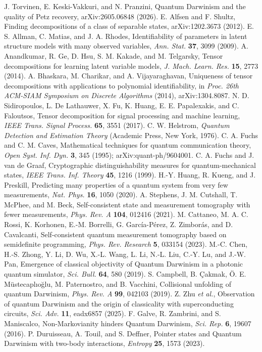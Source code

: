  J. Torvinen, E. Keski-Vakkuri, and N. Pranzini, Quantum Darwinism and the quality of Petz recovery, arXiv:2605.06848 (2026).
 E. Alfsen and F. Shultz, Finding decompositions of a class of separable states, arXiv:1202.3673 (2012).
 E. S. Allman, C. Matias, and J. A. Rhodes, Identifiability of parameters in latent structure models with many observed variables, \emph{Ann. Stat.} \textbf{37}, 3099 (2009).
 A. Anandkumar, R. Ge, D. Hsu, S. M. Kakade, and M. Telgarsky, Tensor decompositions for learning latent variable models, \emph{J. Mach. Learn. Res.} \textbf{15}, 2773 (2014).
 A. Bhaskara, M. Charikar, and A. Vijayaraghavan, Uniqueness of tensor decompositions with applications to polynomial identifiability, in \emph{Proc. 26th ACM-SIAM Symposium on Discrete Algorithms} (2014), arXiv:1304.8087.
 N. D. Sidiropoulos, L. De Lathauwer, X. Fu, K. Huang, E. E. Papalexakis, and C. Faloutsos, Tensor decomposition for signal processing and machine learning, \emph{IEEE Trans. Signal Process.} \textbf{65}, 3551 (2017).
 C. W. Helstrom, \emph{Quantum Detection and Estimation Theory} (Academic Press, New York, 1976).
 C. A. Fuchs and C. M. Caves, Mathematical techniques for quantum communication theory, \emph{Open Syst. Inf. Dyn.} \textbf{3}, 345 (1995); arXiv:quant-ph/9604001.
 C. A. Fuchs and J. van de Graaf, Cryptographic distinguishability measures for quantum-mechanical states, \emph{IEEE Trans. Inf. Theory} \textbf{45}, 1216 (1999).
 H.-Y. Huang, R. Kueng, and J. Preskill, Predicting many properties of a quantum system from very few measurements, \emph{Nat. Phys.} \textbf{16}, 1050 (2020).
 A. Stephens, J. M. Cutshall, T. McPhee, and M. Beck, Self-consistent state and measurement tomography with fewer measurements, \emph{Phys. Rev. A} \textbf{104}, 012416 (2021).
 M. Cattaneo, M. A. C. Rossi, K. Korhonen, E.-M. Borrelli, G. Garc\'ia-P\'erez, Z. Zimbor\'as, and D. Cavalcanti, Self-consistent quantum measurement tomography based on semidefinite programming, \emph{Phys. Rev. Research} \textbf{5}, 033154 (2023).
 M.-C. Chen, H.-S. Zhong, Y. Li, D. Wu, X.-L. Wang, L. Li, N.-L. Liu, C.-Y. Lu, and J.-W. Pan, Emergence of classical objectivity of Quantum Darwinism in a photonic quantum simulator, \emph{Sci. Bull.} \textbf{64}, 580 (2019).
 S. Campbell, B. \c{C}akmak, {\"O}. E. M{\"u}stecapl{\i}o\u{g}lu, M. Paternostro, and B. Vacchini, Collisional unfolding of quantum Darwinism, \emph{Phys. Rev. A} \textbf{99}, 042103 (2019).
 Z. Zhu \emph{et al.}, Observation of quantum Darwinism and the origin of classicality with superconducting circuits, \emph{Sci. Adv.} \textbf{11}, eadx6857 (2025).
 F. Galve, R. Zambrini, and S. Maniscalco, Non-Markovianity hinders Quantum Darwinism, \emph{Sci. Rep.} \textbf{6}, 19607 (2016).
 P. Duruisseau, A. Touil, and S. Deffner, Pointer states and Quantum Darwinism with two-body interactions, \emph{Entropy} \textbf{25}, 1573 (2023).

